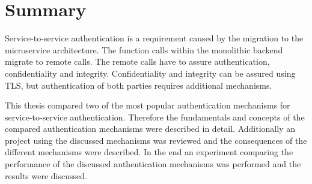\section{Summary}
Service-to-service authentication is a requirement caused by the migration to the microservice architecture.
The function calls within the monolithic backend migrate to remote calls.
The remote calls have to assure authentication, confidentiality and integrity.
Confidentiality and integrity can be assured using TLS, but authentication of both parties requires additional mechanisms.

This thesis compared two of the most popular authentication mechanisms for service-to-service authentication.
Therefore the fundamentals and concepts of the compared authentication mechanisms were described in detail.
Additionally an project using the discussed mechanisms was reviewed and the consequences of the different mechanisms were described.
In the end an experiment comparing the performance of the discussed authentication mechanisms was performed and the results were discussed.

